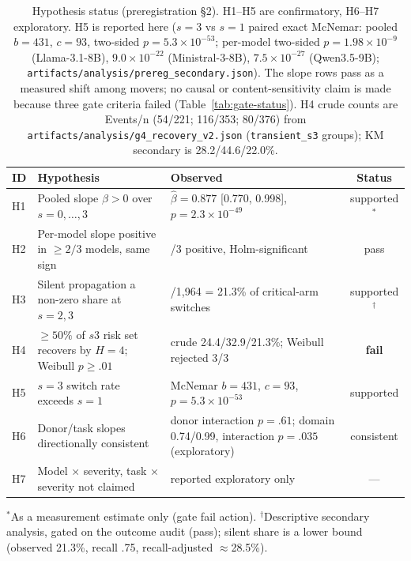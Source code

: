 \documentclass[a4paper,fleqn]{cas-sc}
\begin{document}
\begin{table}[pos=htbp]
  \centering
  \caption{Hypothesis status (preregistration \S2). H1--H5 are confirmatory, H6--H7 exploratory.
  H5 is reported here ($s=3$ vs $s=1$ paired exact McNemar: pooled $b=431$, $c=93$, two-sided
  $p=5.3\times10^{-53}$; per-model two-sided $p=1.98\times10^{-9}$ (Llama-3.1-8B),
  $9.0\times10^{-22}$ (Ministral-3-8B), $7.5\times10^{-27}$ (Qwen3.5-9B);
  \texttt{artifacts/analysis/prereg\_secondary.json}). The slope rows pass as a measured
  shift among movers; no causal or content-sensitivity claim is made because three gate criteria
  failed (Table~\ref{tab:gate-status}). H4 crude counts are Events/n (54/221; 116/353; 80/376)
  from \texttt{artifacts/analysis/g4\_recovery\_v2.json} (\texttt{transient\_s3} groups); KM
  secondary is 28.2/44.6/22.0\%.}
  \label{tab:hypotheses}
  \small
  \begin{tabular}{>{\raggedright\arraybackslash}p{1.1cm}>{\raggedright\arraybackslash}p{6.8cm}>{\raggedright\arraybackslash}p{4.6cm}c}
    \toprule
    \textbf{ID} & \textbf{Hypothesis} & \textbf{Observed} & \textbf{Status} \\
    \midrule
    H1 & Pooled slope $\beta>0$ over $s=0,\dots,3$ & $\hat\beta=0.877$ [0.770, 0.998], $p=2.3\times10^{-49}$ & supported$^{\ast}$ \\
    H2 & Per-model slope positive in $\ge2/3$ models, same sign & 3/3 positive, Holm-significant & pass \\
    H3 & Silent propagation a non-zero share at $s=2,3$ & 419/1{,}964 = 21.3\% of critical-arm switches & supported$^{\dagger}$ \\
    H4 & $\ge50\%$ of $s3$ risk set recovers by $H=4$; Weibull $p\ge.01$ & crude 24.4/32.9/21.3\%; Weibull rejected 3/3 & \textbf{fail} \\
    H5 & $s=3$ switch rate exceeds $s=1$ & McNemar $b=431$, $c=93$, $p=5.3\times10^{-53}$ & supported \\
    H6 & Donor/task slopes directionally consistent & donor interaction $p=.61$; domain 0.74/0.99, interaction $p=.035$ (exploratory) & consistent \\
    H7 & Model $\times$ severity, task $\times$ severity not claimed & reported exploratory only & --- \\
    \bottomrule
  \end{tabular}
\end{table}
\noindent $^{\ast}$As a measurement estimate only (gate fail action). $^{\dagger}$Descriptive
secondary analysis, gated on the outcome audit (pass); silent share is a lower bound
(observed 21.3\%, recall .75, recall-adjusted $\approx$28.5\%).
\end{document}
